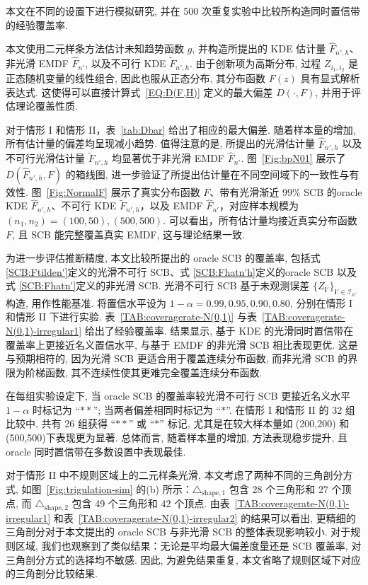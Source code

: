 \documentclass[a4paper,openay,14pt]{ctexbook}
\numberwithin{equation}{section}
\numberwithin{lem}{section}
\begin{document}
本文在不同的设置下进行模拟研究, 并在 500 次重复实验中比较所构造同时置信带的经验覆盖率.

本文使用二元样条方法估计未知趋势函数 \( g \), 并构造所提出的 KDE 估计量 \( \hat{F}_{n',h} \)、非光滑 EMDF \( \hat{F}_{n'} \), 以及不可行 KDE \( \tilde{F}_{n',h} \). 由于创新项为高斯分布, 过程 \( Z_{i_1,i_2} \) 是正态随机变量的线性组合, 因此也服从正态分布, 其分布函数 \( F(z) \) 具有显式解析表达式. 这使得可以直接计算式~\eqref{EQ:D(F,H)} 定义的最大偏差 \( D(\cdot, F) \), 并用于评估理论覆盖性质.

对于情形 I 和情形 II，表~\ref{tab:Dbar} 给出了相应的最大偏差. 随着样本量的增加, 所有估计量的偏差均呈现减小趋势. 值得注意的是, 所提出的光滑估计量 \( \hat{F}_{n',h} \) 以及不可行光滑估计量 \( \tilde{F}_{n',h} \) 均显著优于非光滑 EMDF \( \hat{F}_{n'} \). 图~\ref{Fig:bpN01} 展示了 \( D(\hat{F}_{n',h}, F) \) 的箱线图, 进一步验证了所提出估计量在不同空间域下的一致性与有效性. 图~\ref{Fig:NormalF} 展示了真实分布函数 \( F \)、带有光滑渐近 99\% SCB 的oracle KDE \( \hat{F}_{n',h} \)、不可行 KDE \( \tilde{F}_{n',h} \)，以及 EMDF $\hat{F}_{n'}$，对应样本规模为 \((n_1, n_2) = (100, 50), (500, 500).\) 可以看出，所有估计量均接近真实分布函数 \( F \), 且 SCB 能完整覆盖真实 EMDF, 这与理论结果一致.

为进一步评估推断精度, 本文比较所提出的 oracle SCB 的覆盖率, 包括式 \eqref{SCB:Ftilden'}定义的光滑不可行 SCB、式 \eqref{SCB:Fhatn'h}定义的oracle SCB 以及式 \eqref{SCB:Fhatn'}定义的非光滑 SCB. 光滑不可行 SCB 基于未观测误差 \(\{Z_{\mathbf{i}'}\}_{\mathbf{i}'\in\mathcal{I}_{n'}}\) 构造, 用作性能基准. 将置信水平设为 \(1-\alpha = 0.99, 0.95, 0.90, 0.80\), 分别在情形 I 和情形 II 下进行实验. 表~\ref{TAB:coveragerate-N(0,1)} 与表~\ref{TAB:coveragerate-N(0,1)-irregular1} 给出了经验覆盖率. 结果显示, 基于 KDE 的光滑同时置信带在覆盖率上更接近名义置信水平, 与基于 EMDF 的非光滑 SCB 相比表现更优. 这是与预期相符的, 因为光滑 SCB 更适合用于覆盖连续分布函数, 而非光滑 SCB 的界限为阶梯函数, 其不连续性使其更难完全覆盖连续分布函数.

在每组实验设定下, 当 oracle SCB 的覆盖率较光滑不可行 SCB 更接近名义水平 \(1-\alpha\) 时标记为 “$\ast\ast$”; 当两者偏差相同时标记为 “$\ast$”. 在情形 I 和情形 II 的 32 组比较中, 共有 26 组获得 “$\ast\ast$” 或 “$\ast$” 标记, 尤其是在较大样本量如 (200,200) 和 (500,500)下表现更为显著. 总体而言, 随着样本量的增加, 方法表现稳步提升, 且 oracle 同时置信带在多数设置中表现最佳.

对于情形 II 中不规则区域上的二元样条光滑, 本文考虑了两种不同的三角剖分方式, 如图~\ref{Fig:trigulation-sim} 的(b) 所示：\(\triangle_{\text{shape},1}\) 包含 28 个三角形和 27 个顶点, 而 \(\triangle_{\text{shape},2}\) 包含 49 个三角形和 42 个顶点. 由表~\ref{TAB:coveragerate-N(0,1)-irregular1} 和表~\ref{TAB:coveragerate-N(0,1)-irregular2} 的结果可以看出, 更精细的三角剖分对于本文提出的 oracle SCB 与非光滑 SCB 的整体表现影响较小. 对于规则区域, 我们也观察到了类似结果：无论是平均最大偏差度量还是 SCB 覆盖率, 对三角剖分方式的选择均不敏感. 因此, 为避免结果重复, 本文省略了规则区域下对应的三角剖分比较结果.
\end{document}
